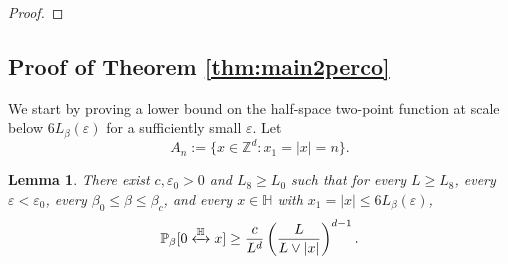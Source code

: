 \documentclass[11pt,a4paper]{article}
\numberwithin{equation}{section}
\theoremstyle{plain}
\newtheorem{Lem}[Thm]{Lemma}
\theoremstyle{definition}
\newcommand{\connect}{\xleftrightarrow}
\begin{document}
\begin{proof}
\end{proof}


 \subsection{Proof of Theorem \ref{thm:main2perco}}

We start by proving a lower bound on the half-space two-point function at scale below $6L_\beta(\varepsilon)$ for a sufficiently small $\varepsilon$. Let 
\begin{equation}
A_n:=\{x\in \mathbb Z^d:x_1=|x|=n\}.
\end{equation}


\begin{Lem}\label{lem:lower below half-space perco} There exist $c,\varepsilon_0>0$ and $L_8\geq L_0$ such that for every $L\geq L_8$, every $\varepsilon<\varepsilon_0$, every $\beta_0\le \beta\le \beta_c$, and every $x\in \mathbb H$ with $x_1=|x|\le 6L_\beta(\varepsilon)$,
\begin{equation}\label{eq:opperco}
\mathbb P_\beta[0\connect{\mathbb H\:}x]\ge \frac{c}{L^d}\left(\frac{L}{L\vee |x|}\right)^{d-1}.
\end{equation}
\end{Lem}
\end{document}
